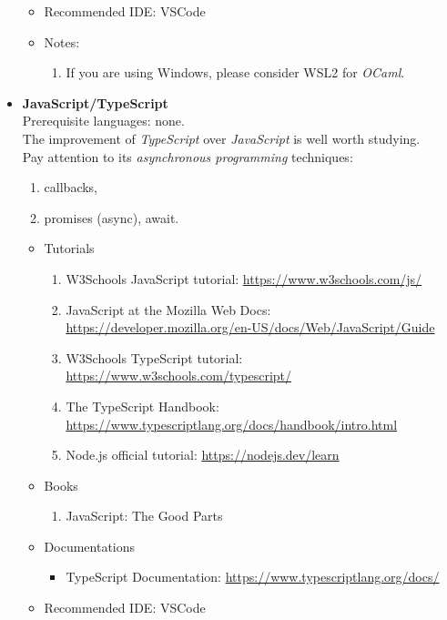 \documentclass{article}
\begin{document}
\begin{itemize}
\begin{itemize}
        \item Recommended IDE: VSCode
        \item Notes:
            \begin{enumerate}
                \item If you are using Windows, please consider WSL2 for \emph{OCaml}.
            \end{enumerate}
    \end{itemize}    
    \item \textbf{JavaScript/TypeScript}\\
    Prerequisite languages: none.\\
    The improvement of \emph{TypeScript} over \emph{JavaScript} is well worth studying.\\
    Pay attention to its \emph{asynchronous programming} techniques:
    \begin{enumerate}
        \item callbacks,
        \item promises (async), await.
    \end{enumerate}
\begin{itemize}
    \item Tutorials   
    \begin{enumerate}
        \item W3Schools JavaScript tutorial:
        \href{https://www.w3schools.com/js/}{https://www.w3schools.com/js/}
        \item JavaScript at the Mozilla Web Docs:\\
        \href{https://developer.mozilla.org/en-US/docs/Web/JavaScript/Guide}{https://developer.mozilla.org/en-US/docs/Web/JavaScript/Guide}
        \item W3Schools TypeScript tutorial:
        \href{https://www.w3schools.com/typescript/}{https://www.w3schools.com/typescript/}
        \item The TypeScript Handbook:\\
        \href{https://www.typescriptlang.org/docs/handbook/intro.html}{https://www.typescriptlang.org/docs/handbook/intro.html}
        \item Node.js official tutorial:
        \href{https://nodejs.dev/learn}{https://nodejs.dev/learn}
    \end{enumerate}
    \item Books
    \begin{enumerate}
        \item JavaScript: The Good Parts
        \cite{crockford2008javascript}
    \end{enumerate}
    \item Documentations
    \begin{itemize}
        \item TypeScript Documentation:
        \href{https://www.typescriptlang.org/docs/}{https://www.typescriptlang.org/docs/}
    \end{itemize}
    \item Recommended IDE: VSCode
\end{itemize}


\end{itemize}
\end{document}
